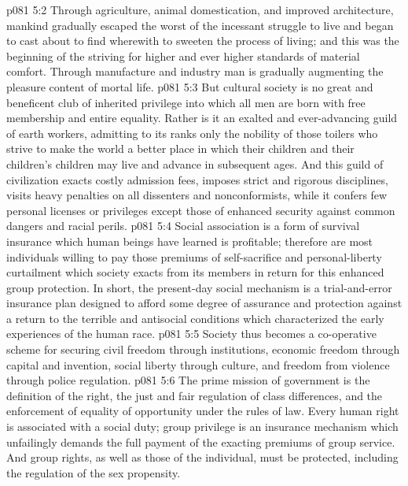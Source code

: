 \vs p081 5:2 Through agriculture, animal domestication, and improved architecture, mankind gradually escaped the worst of the incessant struggle to live and began to cast about to find wherewith to sweeten the process of living; and this was the beginning of the striving for higher and ever higher standards of material comfort. Through manufacture and industry man is gradually augmenting the pleasure content of mortal life.
\vs p081 5:3 But cultural society is no great and beneficent club of inherited privilege into which all men are born with free membership and entire equality. Rather is it an exalted and ever\hyp{}advancing guild of earth workers, admitting to its ranks only the nobility of those toilers who strive to make the world a better place in which their children and their children’s children may live and advance in subsequent ages. And this guild of civilization exacts costly admission fees, imposes strict and rigorous disciplines, visits heavy penalties on all dissenters and nonconformists, while it confers few personal licenses or privileges except those of enhanced security against common dangers and racial perils.
\vs p081 5:4 Social association is a form of survival insurance which human beings have learned is profitable; therefore are most individuals willing to pay those premiums of self\hyp{}sacrifice and personal\hyp{}liberty curtailment which society exacts from its members in return for this enhanced group protection. In short, the present\hyp{}day social mechanism is a trial\hyp{}and\hyp{}error insurance plan designed to afford some degree of assurance and protection against a return to the terrible and antisocial conditions which characterized the early experiences of the human race.
\vs p081 5:5 Society thus becomes a co\hyp{}operative scheme for securing civil freedom through institutions, economic freedom through capital and invention, social liberty through culture, and freedom from violence through police regulation.
\vs p081 5:6  The prime mission of government is the definition of the right, the just and fair regulation of class differences, and the enforcement of equality of opportunity under the rules of law. Every human right is associated with a social duty; group privilege is an insurance mechanism which unfailingly demands the full payment of the exacting premiums of group service. And group rights, as well as those of the individual, must be protected, including the regulation of the sex propensity.
